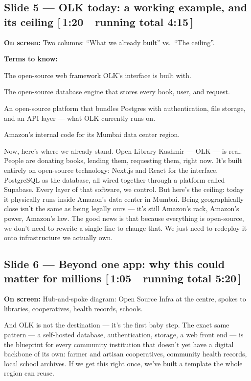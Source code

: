 \documentclass[11pt]{article}
\newcommand{\onscreen}[1]{\noindent\textbf{\color{sovGrey}On screen:} #1\par\vspace{4pt}}
\newcommand{\timing}[2]{\hfill{\normalsize\color{sovGrey}[\,#1\ \textbar\ running total #2\,]}}
\newenvironment{terms}
  {\noindent\textbf{\color{sovGrey}Terms to know:}
   \begin{description}[leftmargin=0pt,style=sameline,labelindent=0pt,itemsep=2pt,topsep=2pt,font=\normalfont\bfseries\color{sovDark}]}
  {\end{description}\vspace{2pt}}
\begin{document}
\subsection*{Slide 5 --- OLK today: a working example, and its ceiling \timing{1:20}{4:15}}
\onscreen{Two columns: ``What we already built'' vs.\ ``The ceiling''.}
\begin{terms}
  \item[Next.js / React] The open-source web framework OLK's interface is built with.
  \item[PostgreSQL] The open-source database engine that stores every book, user, and
    request.
  \item[Supabase] An open-source platform that bundles Postgres with authentication,
    file storage, and an API layer --- what OLK currently runs on.
  \item[\texttt{ap-south-1}] Amazon's internal code for its Mumbai data center region.
\end{terms}
\begin{sayit}
Now, here's where we already stand. Open Library Kashmir --- OLK --- is real. People are
donating books, lending them, requesting them, right now. It's built entirely on
open-source technology: Next.js and React for the interface, PostgreSQL as the
database, all wired together through a platform called Supabase. Every layer of that
software, we control. But here's the ceiling: today it physically runs inside Amazon's
data center in Mumbai. Being geographically close isn't the same as being legally ours
--- it's still Amazon's rack, Amazon's power, Amazon's law. The good news is that
because everything is open-source, we don't need to rewrite a single line to change
that. We just need to redeploy it onto infrastructure we actually own.
\end{sayit}

\subsection*{Slide 6 --- Beyond one app: why this could matter for millions \timing{1:05}{5:20}}
\onscreen{Hub-and-spoke diagram: Open Source Infra at the centre, spokes to libraries,
cooperatives, health records, schools.}
\begin{sayit}
And OLK is not the destination --- it's the first baby step. The exact same pattern ---
a self-hosted database, authentication, storage, a web front end --- is the blueprint
for every community institution that doesn't yet have a digital backbone of its own:
farmer and artisan cooperatives, community health records, local school archives. If we
get this right once, we've built a template the whole region can reuse.
\end{sayit}
\end{document}
